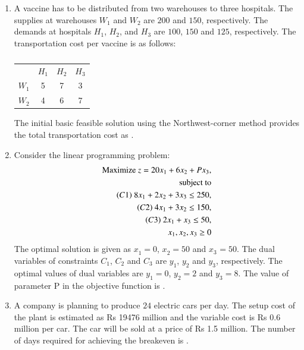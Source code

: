 \documentclass[journal,12pt,onecolumn]{IEEEtran}
\theoremstyle{remark}
\begin{document}
\begin{enumerate}
    \hfill{}

    \item A vaccine has to be distributed from two warehouses to three hospitals. The supplies at warehouses $W_{1}$ and $W_{2}$ are $200$ and $150$, respectively. The demands at hospitals $H_{1}$, $H_{2}$, and $H_{3}$ are $100$, $150$ and $125$, respectively. The transportation cost  per vaccine is as follows:
    \begin{table}[H]
        \centering
        \caption*{}
        \label{tab:q62}
        \begin{tabular}{cccc}
            & $H_{1}$ & $H_{2}$ & $H_{3}$ \\
            $W_{1}$ & 5 & 7 & 3 \\
            $W_{2}$ & 4 & 6 & 7 \\
        \end{tabular}
    \end{table}
    The initial basic feasible solution using the Northwest-corner method provides the total transportation cost  as \underline{\hspace{2cm}}.

    \hfill{}

    \item Consider the linear programming problem:
    \begin{align*}
        \text{Maximize } z=20x_{1}+6x_{2}+Px_{3}, \\
        \text{subject to} \\
        \text{\ensuremath{\left(C1\right)} } 8x_{1}+2x_{2}+3x_{3}\le250, \\
        \text{\ensuremath{\left(C2\right)} } 4x_{1}+3x_{2}\le150, \\
        \text{\ensuremath{\left(C3\right)} } 2x_{1}+x_{3}\le50, \\
        x_{1}, x_{2}, x_{3}\ge0
    \end{align*}
    The optimal solution is given as $x_{1}^{}=0$, $x_{2}^{}=50$ and ${x_{3}}^{}=50$. The dual variables of constraints $C_{1}$, $C_{2}$ and $C_{3}$ are $y_{1}$, $y_{2}$ and $y_{3}$, respectively. The optimal values of dual variables are $y_{1}^{}=0$, $y_{2}^{}=2$ and $y_{3}^{}=8$. The value of parameter P in the objective function is \underline{\hspace{2cm}}.

    \hfill{}

    \item A company is planning to produce $24$ electric cars per day. The setup cost of the plant is estimated as Rs 19476 million and the variable cost is Rs 0.6 million per car. The car will be sold at a price of Rs 1.5 million. The number of days required for achieving the breakeven is \underline{\hspace{2cm}}.


\end{enumerate}
\end{document}
